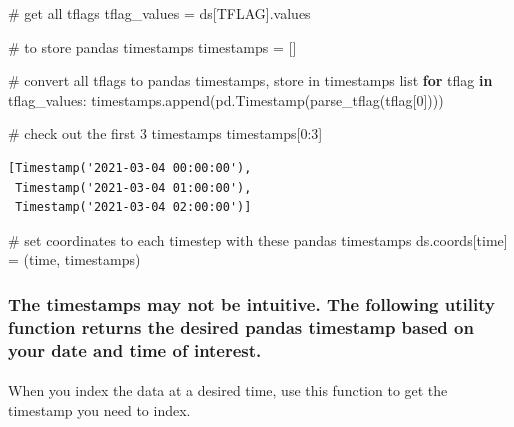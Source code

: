 \documentclass[
  letterpaper,
  DIV=11,
  numbers=noendperiod]{scrreprt}
\makeatletter
\let\oldparagraph\paragraph
\renewcommand{\paragraph}{
    \@ifstar
      \xxxParagraphStar
      \xxxParagraphNoStar
  }
\newcommand{\xxxParagraphStar}[1]{\oldparagraph*{#1}\mbox{}}
\newcommand{\xxxParagraphNoStar}[1]{\oldparagraph{#1}\mbox{}}
\newenvironment{Shaded}{\begin{snugshade}}{\end{snugshade}}
\newcommand{\CommentTok}[1]{\textcolor[rgb]{0.37,0.37,0.37}{#1}}
\newcommand{\ControlFlowTok}[1]{\textcolor[rgb]{0.00,0.23,0.31}{\textbf{#1}}}
\newcommand{\DecValTok}[1]{\textcolor[rgb]{0.68,0.00,0.00}{#1}}
\newcommand{\KeywordTok}[1]{\textcolor[rgb]{0.00,0.23,0.31}{\textbf{#1}}}
\newcommand{\NormalTok}[1]{\textcolor[rgb]{0.00,0.23,0.31}{#1}}
\newcommand{\OperatorTok}[1]{\textcolor[rgb]{0.37,0.37,0.37}{#1}}
\newcommand{\StringTok}[1]{\textcolor[rgb]{0.13,0.47,0.30}{#1}}
\makeatother
\begin{document}
\begin{Shaded}
\begin{Highlighting}[]
\CommentTok{\# get all tflags}
\NormalTok{tflag\_values }\OperatorTok{=}\NormalTok{ ds[}\StringTok{\textquotesingle{}TFLAG\textquotesingle{}}\NormalTok{].values}

\CommentTok{\# to store pandas timestamps}
\NormalTok{timestamps }\OperatorTok{=}\NormalTok{ []}

\CommentTok{\# convert all tflags to pandas timestamps, store in timestamps list}
\ControlFlowTok{for}\NormalTok{ tflag }\KeywordTok{in}\NormalTok{ tflag\_values:}
\NormalTok{    timestamps.append(pd.Timestamp(parse\_tflag(tflag[}\DecValTok{0}\NormalTok{])))}

\CommentTok{\# check out the first 3 timestamps}
\NormalTok{timestamps[}\DecValTok{0}\NormalTok{:}\DecValTok{3}\NormalTok{]}
\end{Highlighting}
\end{Shaded}

\begin{verbatim}
[Timestamp('2021-03-04 00:00:00'),
 Timestamp('2021-03-04 01:00:00'),
 Timestamp('2021-03-04 02:00:00')]
\end{verbatim}

\begin{Shaded}
\begin{Highlighting}[]
\CommentTok{\# set coordinates to each timestep with these pandas timestamps}
\NormalTok{ds.coords[}\StringTok{\textquotesingle{}time\textquotesingle{}}\NormalTok{] }\OperatorTok{=}\NormalTok{ (}\StringTok{\textquotesingle{}time\textquotesingle{}}\NormalTok{, timestamps)}
\end{Highlighting}
\end{Shaded}

\subsubsection{The timestamps may not be intuitive. The following
utility function returns the desired pandas timestamp based on your date
and time of
interest.}\label{the-timestamps-may-not-be-intuitive.-the-following-utility-function-returns-the-desired-pandas-timestamp-based-on-your-date-and-time-of-interest.}

\paragraph{When you index the data at a desired time, use this function
to get the timestamp you need to
index.}\label{when-you-index-the-data-at-a-desired-time-use-this-function-to-get-the-timestamp-you-need-to-index.}
\end{document}
